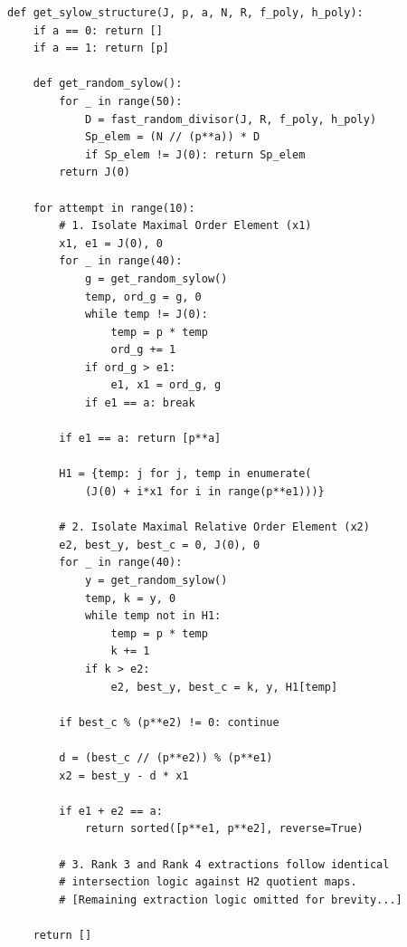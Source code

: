 \documentclass[letterpaper, 11pt]{article}
\begin{document}
\begin{verbatim}
def get_sylow_structure(J, p, a, N, R, f_poly, h_poly):
    if a == 0: return []
    if a == 1: return [p]
    
    def get_random_sylow():
        for _ in range(50):
            D = fast_random_divisor(J, R, f_poly, h_poly)
            Sp_elem = (N // (p**a)) * D
            if Sp_elem != J(0): return Sp_elem
        return J(0)
        
    for attempt in range(10): 
        # 1. Isolate Maximal Order Element (x1)
        x1, e1 = J(0), 0
        for _ in range(40):
            g = get_random_sylow()
            temp, ord_g = g, 0
            while temp != J(0):
                temp = p * temp
                ord_g += 1
            if ord_g > e1:
                e1, x1 = ord_g, g
            if e1 == a: break
        
        if e1 == a: return [p**a]
        
        H1 = {temp: j for j, temp in enumerate(
            (J(0) + i*x1 for i in range(p**e1)))}
            
        # 2. Isolate Maximal Relative Order Element (x2)
        e2, best_y, best_c = 0, J(0), 0
        for _ in range(40):
            y = get_random_sylow()
            temp, k = y, 0
            while temp not in H1:
                temp = p * temp
                k += 1
            if k > e2:
                e2, best_y, best_c = k, y, H1[temp]
                
        if best_c % (p**e2) != 0: continue 
            
        d = (best_c // (p**e2)) % (p**e1)
        x2 = best_y - d * x1
        
        if e1 + e2 == a:
            return sorted([p**e1, p**e2], reverse=True)
            
        # 3. Rank 3 and Rank 4 extractions follow identical 
        # intersection logic against H2 quotient maps.
        # [Remaining extraction logic omitted for brevity...]
        
    return []
\end{verbatim}
\end{document}
